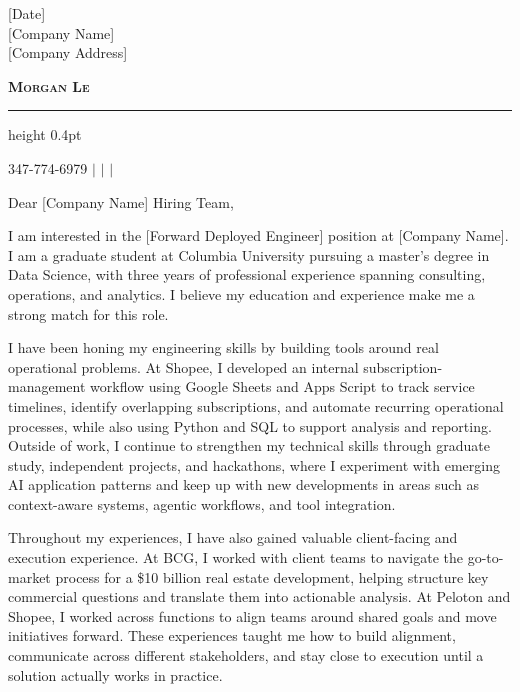 \documentclass[a4paper,11pt]{letter}
\begin{document}
\signature{Morgan Le}
\date{}
\longindentation=0pt
\let\raggedleft\raggedright

\begin{letter}{[Date] \\{} 
[Company Name] \\{} 
[Company Address]}

\begin{center}
    \textbf{\Huge \scshape Morgan Le}\par
    \vspace{5pt}
    \hrule height 0.4pt
    \vspace{0pt}
    {\small 347-774-6979 $|$
    \href{mailto:ml5536@columbia.edu}{\underline{}} $|$
    \href{https://www.linkedin.com/in/morganhle/}{\underline{}} $|$
    \href{https://lhnminh.github.io/}{\underline{}}\par}
\end{center}
\vspace*{0.15in}

\opening{Dear [Company Name] Hiring Team,}

\noindent I am interested in the [Forward Deployed Engineer] position at [Company Name]. I am a graduate student at Columbia University pursuing a master's degree in Data Science, with three years of professional experience spanning consulting, operations, and analytics. I believe my education and experience make me a strong match for this role.

\noindent I have been honing my engineering skills by building tools around real operational problems. At Shopee, I developed an internal subscription-management workflow using Google Sheets and Apps Script to track service timelines, identify overlapping subscriptions, and automate recurring operational processes, while also using Python and SQL to support analysis and reporting. Outside of work, I continue to strengthen my technical skills through graduate study, independent projects, and hackathons, where I experiment with emerging AI application patterns and keep up with new developments in areas such as context-aware systems, agentic workflows, and tool integration.

\noindent Throughout my experiences, I have also gained valuable client-facing and execution experience. At BCG, I worked with client teams to navigate the go-to-market process for a \$10 billion real estate development, helping structure key commercial questions and translate them into actionable analysis. At Peloton and Shopee, I worked across functions to align teams around shared goals and move initiatives forward. These experiences taught me how to build alignment, communicate across different stakeholders, and stay close to execution until a solution actually works in practice.


\end{letter}
\end{document}

